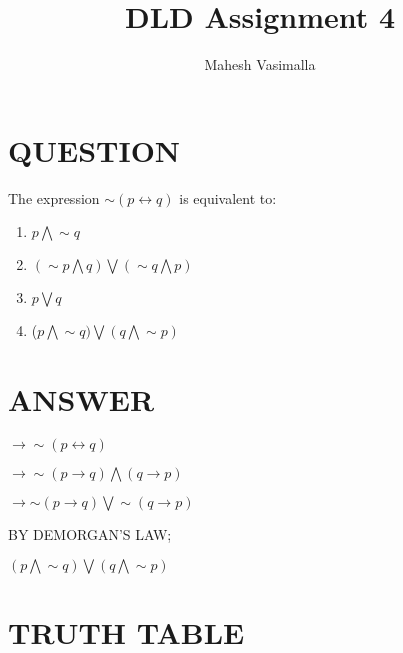 \documentclass{article}
\title{DLD Assignment 4}
\author{Mahesh Vasimalla}
\begin{document}
  
 \maketitle

  \section{QUESTION}
   The expression $ \sim(p \leftrightarrow q)$   is equivalent to:
  
 
 \begin{enumerate}[label=(\Alph*)]
     \item  $ p \bigwedge \sim q $
     \item  $(\sim p \bigwedge q) \bigvee (\sim q \bigwedge p)$
     \item  $p \bigvee q$
     \item  ($p \bigwedge \sim q) \bigvee (q \bigwedge \sim p)$
 
\end{enumerate} 
   

   
  \section{ANSWER}
    $ \to  \sim (p\leftrightarrow q) $
   
    $ \to  \sim {(p\longrightarrow q)\bigwedge(q \longrightarrow p)}$ 
    
    $ \to  { \sim(p \longrightarrow q) \bigvee \sim(q\longrightarrow p) }$
    
BY DEMORGAN'S LAW;

   ${(p \bigwedge  \sim q) \bigvee (q \bigwedge \sim p) }$
 

  
\section{TRUTH TABLE}
  
\end{document}

